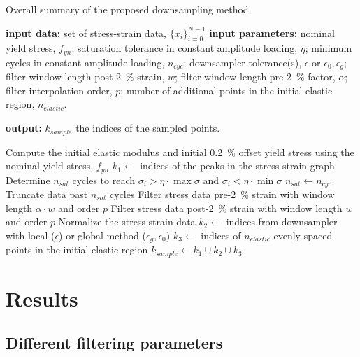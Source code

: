 \documentclass[a4paper,11pt]{article}
\begin{document}
\begin{algorithm}
	\caption{Overall summary of the proposed downsampling method.}
	\label{alg:overall-summary}
	\begin{algorithmic}[1]
        \State \textbf{input data:} set of stress-strain data, $\{x_i\}_{i=0}^{N-1}$
        \State \textbf{input parameters:} nominal yield stress, $f_{yn}$; saturation tolerance in constant amplitude loading, $\eta$; minimum cycles in constant amplitude loading, $n_{cyc}$; downsampler tolerance(s), $\epsilon$ or $\epsilon_0, \epsilon_g$; filter window length post-2~\% strain, $w$; filter window length pre-2~\% factor, $\alpha$; filter interpolation order, $p$; number of additional points in the initial elastic region, $n_{elastic}$.

        \State \textbf{output:} $k_{sample}$ the indices of the sampled points.
        \bigskip

        \State Compute the initial elastic modulus and initial 0.2~\% offset yield stress using the nominal yield stress, $f_{yn}$
        \State $k_{1} \gets $ indices of the peaks in the stress-strain graph
            \State Determine $n_{sat}$ cycles to reach $\sigma_i > \eta \cdot \max \sigma$ and $\sigma_i < \eta \cdot \min \sigma$
                \State $n_{sat} \gets n_{cyc}$
            \EndIf
            \State Truncate data past $n_{sat}$ cycles
        \EndIf
        \State Filter stress data pre-2~\% strain with window length $\alpha \cdot w$ and order $p$
        \State Filter stress data post-2~\% strain with window length $w$ and order $p$
        \State Normalize the stress-strain data
        \State $k_2 \gets$ indices from downsampler with local ($\epsilon$) or global method ($\epsilon_g, \epsilon_0$) \label{algline:downsampler}
        \State $k_3 \gets$ indices of $n_{elastic}$ evenly spaced points in the initial elastic region
        \State $k_{sample} \gets k_1 \cup k_2 \cup k_3$
    \end{algorithmic}
\end{algorithm}



\section{Results}

\subsection{Different filtering parameters}
\end{document}
